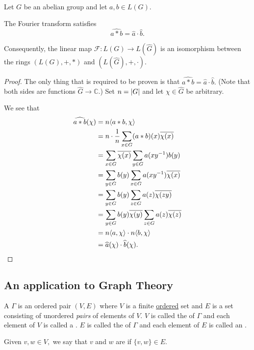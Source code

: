 \documentclass[12pt]{article}	%
\begin{document}
\begin{thm} \label{thm:fourierisorings}
    Let $G$ be an abelian group and let $a, b \in L(G).$

    The Fourier transform satisfies
    \begin{equation*}
        \widehat{a * b} = \widehat{a} \cdot \widehat{b}.
    \end{equation*}
    
    Consequently, the linear map $\mathcal{F} : L(G) \to L(\widehat{G})$ is an isomorphism between the rings $(L(G), +, *)$ and $(L(\widehat{G}), +, \cdot).$
\end{thm}
\begin{proof}
    The only thing that is required to be proven is that $\widehat{a * b} = \widehat{a} \cdot \widehat{b}.$ (Note that both sides are functions $\widehat{G} \to \mathbb{C}.$) Set $n = {\left\lvert G \right\lvert}$ and let $\chi \in \widehat{G}$ be arbitrary.
    
    We see that
    \begin{align*}
        \widehat{a * b}(\chi) &= n \langle a * b, \chi\rangle \\
        &= n \cdot \frac{1}{n} \sum_{x \in G} (a * b)(x) \overline{\chi(x)} \\
        &= \sum_{x \in G}\overline{\chi(x)} \sum_{y \in G} a(xy^{-1})b(y) \\
        &= \sum_{y \in G}b(y) \sum_{x \in G}a(xy^{-1})\overline{\chi(x)} \\
        &= \sum_{y \in G}b(y) \sum_{z \in G}a(z)\overline{\chi(zy)} \\
        &= \sum_{y \in G}b(y)\overline{\chi(y)} \sum_{z \in G}a(z)\overline{\chi(z)} \\
        &= n\langle a, \chi\rangle \cdot n\langle b, \chi\rangle \\
        &= \widehat{a}(\chi) \cdot \widehat{b}(\chi). \qedhere
    \end{align*}
\end{proof}

\subsection{An application to Graph Theory}

\begin{defn}%
    A  $\Gamma$ is an ordered pair $(V, E)$ where $V$ is a finite \underline{ordered} set and $E$ is a set consisting of unordered \emph{pairs} of elements of $V.$ $V$ is called the  of $\Gamma$ and each element of $V$ is called a . $E$ is called the  of $\Gamma$ and each element of $E$ is called an .

    Given $v, w \in V,$ we say that $v$ and $w$ are  if $\{v, w\} \in E.$
\end{defn}
\end{document}
